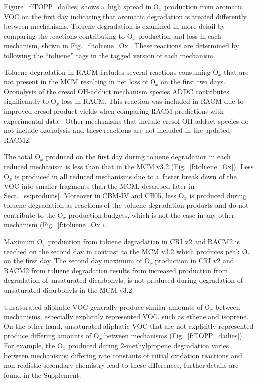\documentclass[acpd, online, hvmath]{copernicus}
\begin{document}
Figure~\ref{f:TOPP_dailies} shows a~high spread in O$_{x}$
production from aromatic VOC on the first day indicating that aromatic
degradation is treated differently between mechanisms.  Toluene
degradation is examined in more detail by comparing the reactions
contributing to O$_{x}$ production and loss in each mechanism,
shown in Fig.~\ref{f:toluene_Ox}.  These reactions are determined by
following the ``toluene'' tags in the tagged version of each
mechanism.

Toluene degradation in RACM includes several reactions consuming
O$_{x}$ that are not present in the MCM resulting in net loss of
O$_{x}$ on the first two days.  Ozonolysis of the cresol OH-adduct
mechanism species ADDC contributes significantly to O$_{x}$ loss in
RACM.  This reaction was included in RACM due to improved cresol
product yields when comparing RACM predictions with experimental data
\citep{Stockwell:1997}.  Other mechanisms that include cresol
OH-adduct species do not include ozonolysis and these reactions are
not included in the updated RACM2.

The total O$_{x}$ produced on the first day during toluene
degradation in each reduced mechanism is less than that in the MCM
v3.2 (Fig.~\ref{f:toluene_Ox}).  Less O$_{x}$ is produced in all
reduced mechanisms due to a~faster break down of the VOC into smaller
fragments than the MCM, described later in Sect.~\ref{ss:products}.
Moreover in CBM-IV and CB05, less O$_{x}$ is produced during
toluene degradation as reactions of the toluene degradation products
 and  do not contribute to the O$_{x}$
production budgets, which is not the case in any other mechanism
(Fig.~\ref{f:toluene_Ox}).

Maximum O$_{x}$ production from toluene degradation in CRI v2 and
RACM2 is reached on the second day in contrast to the MCM v3.2 which
produces peak O$_{x}$ on the first day.  The second day maximum of
O$_{x}$ production in CRI v2 and RACM2 from toluene degradation
results from increased  production from degradation of
unsaturated dicarbonyls;  is not produced during
degradation of unsaturated dicarbonyls in the MCM v3.2.

Unsaturated aliphatic VOC generally produce similar amounts of
O$_{x}$ between mechanisms, especially explicitly represented VOC,
such as ethene and isoprene.  On the other hand, unsaturated aliphatic
VOC that are not explicitly represented produce differing amounts of
O$_{x}$ between mechanisms (Fig.~\ref{f:TOPP_dailies}).  For
example, the O$_{x}$ produced during $2$-methylpropene degradation
varies between mechanisms; differing rate constants of initial
oxidation reactions and non-realistic secondary chemistry lead to
these differences, further details are found in the Supplement.
\end{document}
